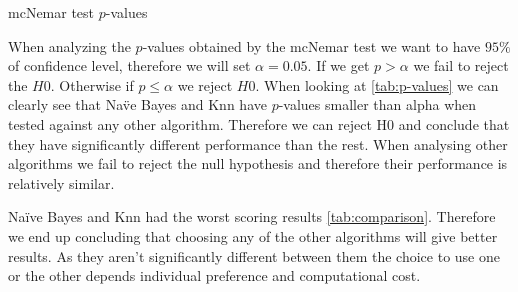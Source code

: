 \begin{table}[H]
\centering
\caption{mcNemar test $p$-values}
\label{tab:p-values}

\end{table}

When analyzing the $p$-values obtained by the mcNemar test we want to have $95\%$ of confidence level, therefore we will set $\alpha = 0.05$. If we get $p > \alpha$ we fail to reject the $H0$. Otherwise if $p \leq \alpha$ we reject $H0$. When looking at \cref{tab:p-values} we can clearly see that Na\"ve Bayes and Knn have $p$-values smaller than alpha when tested against any other algorithm. Therefore we can reject H0 and conclude that they have significantly different performance than the rest. When analysing other algorithms we fail to reject the null hypothesis and therefore their performance is relatively similar. 

Na\"ive Bayes and Knn had the worst scoring results \cref{tab:comparison}. Therefore we end up concluding that choosing any of the other algorithms will give better results. As they aren't significantly different between them the choice to use one or the other depends individual preference and computational cost.